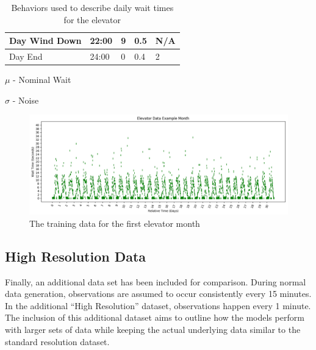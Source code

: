 \begin{table}[!htb]
\begin{tabular}{|l|l|l|l|l|}
      Day Wind Down          & 22:00    & 9                                 & 0.5                           & N/A      \\ \hline
      Day End                & 24:00    & 0                                 & 0.4                           & 2        \\ \hline
    \end{tabular}
    \begin{tablenotes}
      \small
      \item $\mu$ - Nominal Wait
      \item $\sigma$ - Noise
    \end{tablenotes}
    \caption{Behaviors used to describe daily wait times for the elevator}
    \label{table:elevator_day_t}
  \end{table}



  \begin{figure}[!htb]
    \centering
    \includegraphics[width=\linewidth]{images/Elevator_Data_Example_Month.png}
    \caption{The training data for the first elevator month}
    \label{figure:Elevator_Example_Data}
  \end{figure}


  \subsection{ High Resolution Data }

  Finally, an additional data set has been included for comparison. During
  normal data generation, observations are assumed to occur consistently every
  15 minutes. In the additional ``High Resolution'' dataset, observations happen
  every 1 minute. The inclusion of this additional dataset aims to outline how
  the models perform with larger sets of data while keeping the actual
  underlying data similar to the standard resolution dataset. \\


